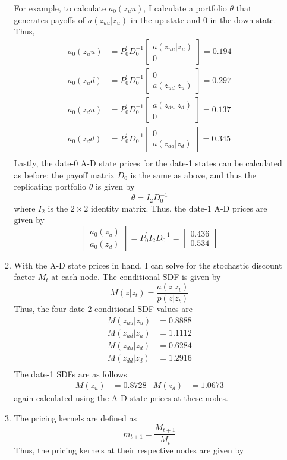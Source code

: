\documentclass[11pt]{article}
\newcommand{\inv}[1]{#1^{-1}}
\begin{document}
\begin{enumerate}
\begin{enumerate}
		For example, to calculate \(a_0(z_uu)\), I calculate a portfolio \(\theta\) that generates payoffs of \(a(z_{uu} | z_u)\) in the up state and 0 in the down state. Thus, 
		\begin{align*}
			a_0(z_uu) &= P_0^\prime \inv{D_0} \begin{bmatrix} a(z_{uu} | z_u) \\ 0 \end{bmatrix} = 0.194 \\
			a_0(z_ud) &= P_0^\prime \inv{D_0} \begin{bmatrix} 0 \\ a(z_{ud} | z_u) \end{bmatrix} = 0.297 \\
			a_0(z_du) &= P_0^\prime \inv{D_0} \begin{bmatrix} a(z_{du} | z_d) \\ 0 \end{bmatrix} = 0.137 \\
			a_0(z_dd) &= P_0^\prime \inv{D_0} \begin{bmatrix} 0 \\ a(z_{dd} | z_d) \end{bmatrix} = 0.345 \\
		\end{align*}
		Lastly, the date-0 A-D state prices for the date-1 states can be calculated as before: the payoff matrix \(D_0\) is the same as above, and thus the replicating portfolio \(\theta\) is given by 
		\[\theta = I_2 \inv{D_0} \]
		where \(I_2\) is the \(2\times 2\) identity matrix. Thus, the date-1 A-D prices are given by 
		\[\begin{bmatrix}
			a_0(z_u) \\ a_0(z_d)
		\end{bmatrix} = P_0^\prime I_2 \inv{D_0} = \begin{bmatrix}
			0.436 \\ 0.534
		\end{bmatrix}\]
	
		\item With the A-D state prices in hand, I can solve for the stochastic discount factor \(M_t\) at each node. The conditional SDF is given by 
		\[M(z | z_t) = \frac{a(z | z_t)}{p(z | z_t)}\]
		Thus, the four date-2 conditional SDF values are
		\begin{align*}
			M(z_{uu}|z_u) &= 0.8888 \\ 
			M(z_{ud}|z_u) &= 1.1112 \\
			M(z_{du}|z_d) &= 0.6284 \\ 
			M(z_{dd}|z_d) &= 1.2916 \\
		\end{align*}
		The date-1 SDFs are as follows
		\begin{align*}
			M(z_u) &= 0.8728 & M(z_d) &= 1.0673
		\end{align*}
		again calculated using the A-D state prices at these nodes.
		\item The pricing kernels are defined as 
		\[m_{t+1} = \frac{M_{t+1}}{M_t}\]
		Thus, the pricing kernels at their respective nodes are given by


\end{enumerate}
\end{enumerate}
\end{document}
